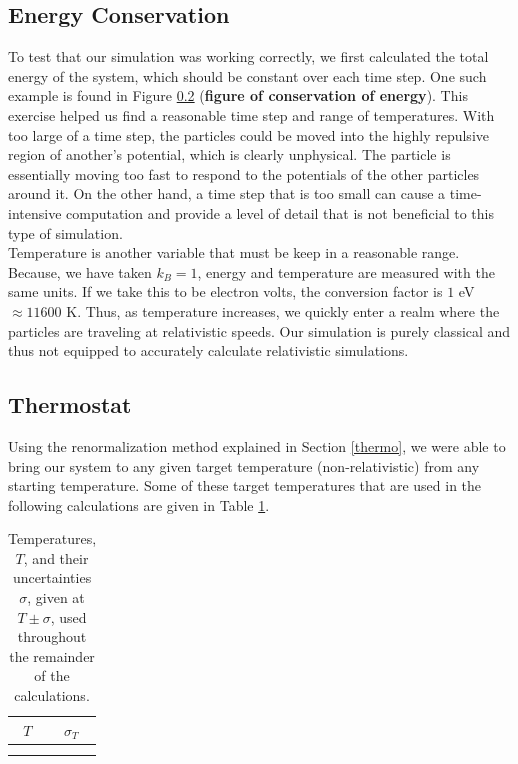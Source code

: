 \documentclass{article}
\begin{document}
\begin{multicols}{2}
\subsection{Energy Conservation}

To test that our simulation was working correctly, we first calculated the total energy of the system, which should be constant over each time step.  One such example is found in Figure \ref{} (\textbf{figure of conservation of energy}).  This exercise helped us find a reasonable time step and range of temperatures.  With too large of a time step, the particles could be moved into the highly repulsive region of another's potential, which is clearly unphysical.  The particle is essentially moving too fast to respond to the potentials of the other particles around it.  On the other hand, a time step that is too small can cause a time-intensive computation and provide a level of detail that is not beneficial to this type of simulation.  \\

Temperature is another variable that must be keep in a reasonable range.  Because, we have taken $k_B =1$, energy and temperature are measured with the same units.  If we take this to be electron volts, the conversion factor is $1 $ eV $\approx 11600$ K.  Thus, as temperature increases, we quickly enter a realm where the particles are traveling at relativistic speeds.  Our simulation is purely classical and thus not equipped to accurately calculate relativistic simulations.

\subsection{Thermostat}

Using the renormalization method explained in Section \ref{thermo}, we were able to bring our system to any given target temperature (non-relativistic) from any starting temperature.  Some of these target temperatures that are used in the following calculations are given in Table \ref{temptable}.  \\

\begin{table}
\begin{center}
\begin{tabular}{| c | c |}
\hline $T$ & $\sigma_T$ \\ \hline
 &  \\ \hline
 &  \\ \hline
\end{tabular}
\label{temptable}
\caption{Temperatures, $T$, and their uncertainties $\sigma$, given at $T \pm \sigma$, used throughout the remainder of the calculations.}
\end{center}
\end{table}


\end{multicols}
\end{document}
